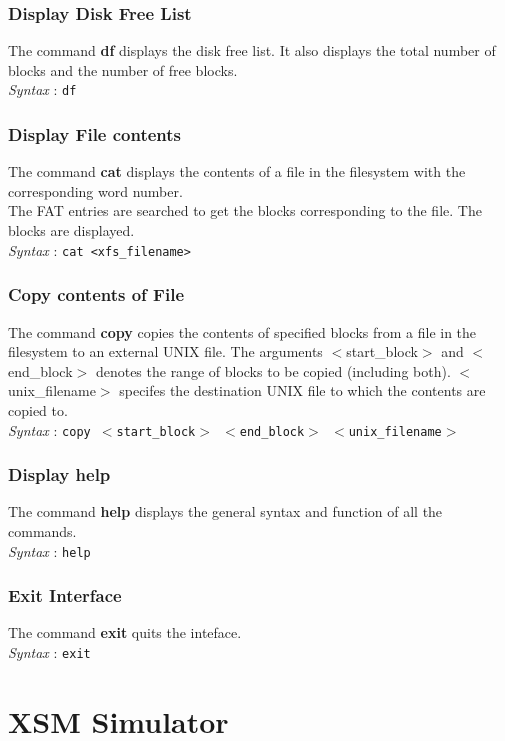\documentclass[11pt]{report}
\begin{document}
\subsection{Display Disk Free List}
The command \textbf{df} displays the disk free list. It also displays the total number of blocks and the number of free blocks.\\
\textit{Syntax} : \texttt{df}

\subsection{Display File contents}
The command \textbf{cat} displays the contents of a file in the filesystem with the corresponding word number.\\
The FAT entries are searched to get the blocks corresponding to the file. The blocks are displayed.\\

\textit{Syntax} : \texttt{cat <xfs\_filename> }

\subsection{Copy contents of File}
The command \textbf{copy} copies the contents of specified blocks from a file in the filesystem to an external UNIX file. The arguments $<$start\_block$>$ and $<$end\_block$>$ denotes the range of blocks to be copied (including both). $<$unix\_filename$>$ specifes the destination UNIX file to which the contents are copied to.\\
\textit{Syntax} : \texttt{copy $<$start\_block$>$ $<$end\_block$>$ $<$unix\_filename$>$}

\subsection{Display help}
The command \textbf{help} displays the general syntax and function of all the commands. \\
\textit{Syntax} : \texttt{help}

\subsection{Exit Interface}
The command \textbf{exit} quits the inteface.\\
\textit{Syntax} : \texttt{exit}

 
\chapter{XSM Simulator} 
 
\end{document}
